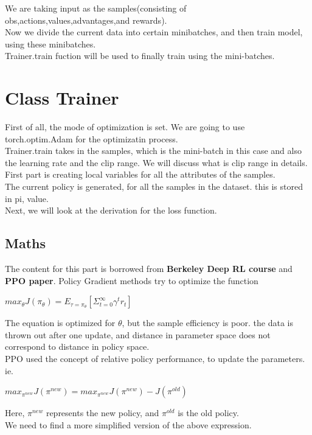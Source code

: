 \documentclass[12pt]{extarticle}
\begin{document}
We are taking input as the samples(consisting of obs,actions,values,advantages,and rewards).\\
Now we divide the current data into certain minibatches, 
and then train model, using these minibatches. \\
\newline 
Trainer.train fuction will be used to finally train using the mini-batches. 

\section{Class Trainer}
First of all, the mode of optimization is set. We are going to use torch.optim.Adam for the optimizatin process. \\
\newline
Trainer.train takes in the samples, which is the mini-batch in this case and also the learning rate and the clip range. We will discuss what is clip range in details. \\
First part is creating local variables for all the attributes of the samples. \\

The current policy is generated, for all the samples in the dataset. this is stored in pi, value. \\
Next, we will look at the derivation for the loss function. \\
\subsection{Maths}
The content for this part is borrowed from \textbf{Berkeley Deep RL course} and \textbf{PPO paper}. 
\newline
Policy Gradient methods try to optimize the function 
\begin{center}
$max_{\theta} J(\pi_{\theta})=E_{\tau=\pi_{\theta}}[\Sigma_{t=0}^{\infty}\gamma^{t} r_t]$
\end{center}
The equation is optimized for $\theta$, but the sample efficiency is poor. the data is thrown out after one update, and distance in parameter space does not correspond to distance in policy space. \\
PPO used the concept of relative policy performance, to update the parameters. 
ie.
\begin{center}
$max_{\pi^{new}}J(\pi^{new})=max_{\pi^{new}}J(\pi^{new})- J(\pi^{old})$
\end{center}
Here, $\pi^{new}$ represents the new policy, and $\pi^{old}$ is the old policy. \\
\newline
We need to find a more simplified version of the above expression. \\
\end{document}
